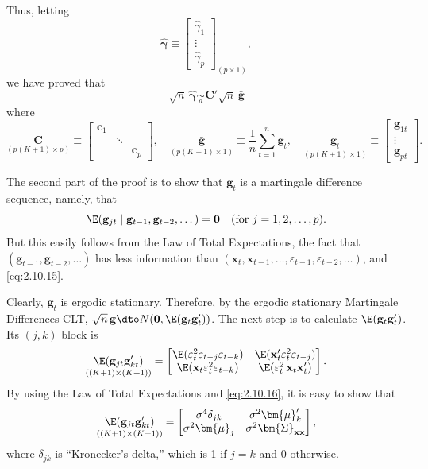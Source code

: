 %
Thus, letting
\[
\hat{\bm{\gamma}} \equiv \begin{bmatrix}
\hat{\gamma}_1 \\ \vdots \\ \hat{\gamma}_p
\end{bmatrix}_{(p\times 1)},
\]
we have proved that
\[
\sqrt{n}\,\hat{\bm{\gamma}} \underset{a}{\sim}
\mathbf{C}'\sqrt{n}\,\bar{\mathbf{g}}
\]
where
\[
\underset{(p(K+1)\times p)}{\mathbf{C}}
\equiv \begin{bmatrix}
\mathbf{c}_1 & & \\ & \ddots & \\ & & \mathbf{c}_p
\end{bmatrix}, \quad
\underset{(p(K+1)\times 1)}{\bar{\mathbf{g}}}
\equiv \frac{1}{n}\sum_{t=1}^{n}\mathbf{g}_t, \quad
\underset{(p(K+1)\times 1)}{\mathbf{g}_t}
\equiv \begin{bmatrix}
\mathbf{g}_{1t} \\ \vdots \\ \mathbf{g}_{pt}
\end{bmatrix}.
\]

The second part of the proof is to show that $\mathbf{g}_t$ is a martingale difference
sequence, namely, that
\[
\E(\mathbf{g}_{jt} \mid \mathbf{g}_{t-1}, \mathbf{g}_{t-2}, \ldots\,) = \mathbf{0}
\quad (\text{for } j = 1, 2, \ldots, p).
\]
%
But this easily follows from the Law of Total Expectations, the fact that
$(\mathbf{g}_{t-1}, \mathbf{g}_{t-2}, \ldots)$ has less information than
$(\mathbf{x}_t, \mathbf{x}_{t-1}, \ldots, \varepsilon_{t-1}, \varepsilon_{t-2}, \ldots)$,
and \eqref{eq:2.10.15}.

Clearly, $\mathbf{g}_t$ is ergodic stationary. Therefore, by the ergodic stationary Martingale Differences CLT, $\sqrt{n}\,\bar{\mathbf{g}} \dto N(\mathbf{0}, \E(\mathbf{g}_t\mathbf{g}_t'))$.
The next step is to calculate $\E(\mathbf{g}_t\mathbf{g}_t')$. Its $(j, k)$ block is
%
\[
\underset{((K+1)\times(K+1))}{\E(\mathbf{g}_{jt}\mathbf{g}_{kt}')}
= \begin{bmatrix}
\E(\varepsilon_t^2\varepsilon_{t-j}\varepsilon_{t-k})
  & \E(\mathbf{x}_t'\varepsilon_t^2\varepsilon_{t-j}) \\
\E(\mathbf{x}_t\varepsilon_t^2\varepsilon_{t-k})
  & \E(\varepsilon_t^2\,\mathbf{x}_t\mathbf{x}_t')
\end{bmatrix}.
\]
%
By using the Law of Total Expectations and \eqref{eq:2.10.16}, it is easy to show that
%
\begin{equation}
\underset{((K+1)\times(K+1))}{\E(\mathbf{g}_{jt}\mathbf{g}_{kt}')}
= \begin{bmatrix}
\sigma^4\delta_{jk} & \sigma^2\bm{\mu}_k' \\
\sigma^2\bm{\mu}_j & \sigma^2\bm{\Sigma}_{\mathbf{xx}}
\end{bmatrix},
\label{eq:2.B.2}
\end{equation}
%
where $\delta_{jk}$ is ``Kronecker's delta,'' which is 1 if $j = k$ and 0 otherwise.

